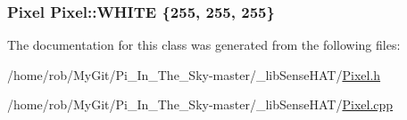 \subsubsection[{\texorpdfstring{W\+H\+I\+TE}{WHITE}}]{ {\bf Pixel} Pixel\+::\+W\+H\+I\+TE \{255, 255, 255\}\hspace{0.3cm}{\ttfamily [static]}}\hypertarget{class_pixel_a12c08beec64c8d57bdd9ef3b49244aa3}{}\label{class_pixel_a12c08beec64c8d57bdd9ef3b49244aa3}


The documentation for this class was generated from the following files\+:\begin{DoxyCompactItemize}
\item 
/home/rob/\+My\+Git/\+Pi\+\_\+\+In\+\_\+\+The\+\_\+\+Sky-\/master/\+\_\+lib\+Sense\+H\+A\+T/\hyperlink{_pixel_8h}{Pixel.\+h}\item 
/home/rob/\+My\+Git/\+Pi\+\_\+\+In\+\_\+\+The\+\_\+\+Sky-\/master/\+\_\+lib\+Sense\+H\+A\+T/\hyperlink{_pixel_8cpp}{Pixel.\+cpp}\end{DoxyCompactItemize}
